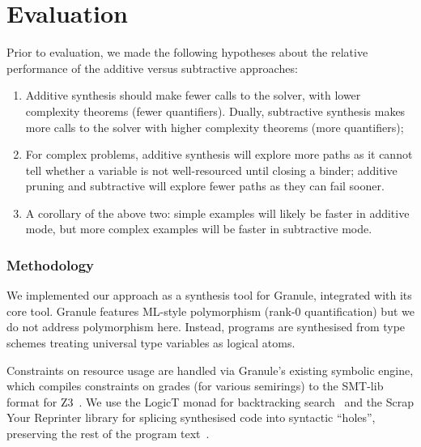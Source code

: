 \section{Evaluation}

\newcommand{\stderr}[1]{\textcolor{gray}{${#1}$}} %
\newcommand{\fail}{\textcolor{mypink3}{$\times$}}
\newcommand{\success}{\checkmark}
\newcommand{\highlight}[1]{%
{\setlength{\fboxsep}{0pt}\colorbox{yellow!50}{$\displaystyle#1$}}}

Prior to evaluation, we made the following hypotheses about the
relative performance of the additive versus subtractive approaches:
%
\begin{enumerate}[itemsep=0em]
\item Additive synthesis should make fewer calls to the solver, with lower
complexity theorems (fewer quantifiers). Dually,
subtractive synthesis makes more calls to the solver with
higher complexity theorems (more quantifiers);

\item For complex problems, additive synthesis will
explore more paths as it cannot tell whether a variable is not
well-resourced until closing a binder; additive pruning and subtractive will
explore fewer paths as they can fail sooner.

\item A corollary of the above two: simple examples will
likely be faster in additive mode, but more complex examples will be
faster in subtractive mode.
\end{enumerate}

\subsubsection{Methodology}
We implemented our approach as a synthesis tool for
Granule, integrated with its core tool. Granule features
ML-style polymorphism (rank-0 quantification) but we do not address polymorphism here.
Instead, programs are synthesised from type schemes treating universal
type variables as logical atoms. %

Constraints on resource usage are handled via Granule's existing
symbolic engine, which compiles constraints on grades (for various semirings)
to the SMT-lib format for Z3~\cite{z3}.
We use the LogicT
monad for backtracking search~\cite{logict}
and the Scrap Your Reprinter library for
splicing synthesised code into syntactic ``holes'',
preserving the rest of the program text~\cite{clarke2017scrap}.

